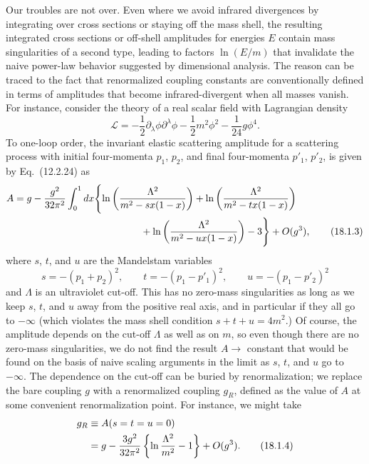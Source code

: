 Our troubles are not over. Even where we avoid infrared divergences by
integrating over cross sections or staying off the mass shell, the resulting
integrated cross sections or off-shell amplitudes for energies $E$ contain
mass singularities of a second type, leading to factors $\ln(E/m)$ that
invalidate the naive power-law behavior suggested by dimensional analysis.
The reason can be traced to the fact that renormalized coupling constants are
conventionally defined in terms of amplitudes that become infrared-divergent
when all masses vanish. For instance, consider the theory of a real scalar
field with Lagrangian density
\begin{equation}
 \mathcal{L}=-\frac{1}{2}\partial_\lambda\phi\partial^\lambda\phi
 -\frac{1}{2}m^2\phi^2-\frac{1}{24}g\phi^4 .
 \tag{18.1.2}
 \label{eq:18.1.2}
\end{equation}
To one-loop order, the invariant elastic scattering amplitude for a
scattering process with initial four-momenta $p_1$, $p_2$, and final
four-momenta $p'_1$, $p'_2$, is given by Eq.~(12.2.24) as
\begin{align}
 A={}&g-\frac{g^2}{32\pi^2}\int_0^1dx\Biggl\{
 \ln\left(\frac{\Lambda^2}{m^2-sx(1-x)}\right)
 +\ln\left(\frac{\Lambda^2}{m^2-tx(1-x)}\right) \notag\\
 &\hspace{41mm}
 +\ln\left(\frac{\Lambda^2}{m^2-ux(1-x)}\right)-3\Biggr\}
 +O(g^3) ,
 \tag{18.1.3}
 \label{eq:18.1.3}
\end{align}
where $s$, $t$, and $u$ are the Mandelstam variables
\[
 s=-(p_1+p_2)^2,\qquad t=-(p_1-p'_1)^2,\qquad
 u=-(p_1-p'_2)^2
\]
and $\Lambda$ is an ultraviolet cut-off. This has no zero-mass singularities
as long as we keep $s$, $t$, and $u$ away from the positive real axis, and in
particular if they all go to $-\infty$ (which violates the mass shell
condition $s+t+u=4m^2$.) Of course, the amplitude depends on the cut-off
$\Lambda$ as well as on $m$, so even though there are no zero-mass
singularities, we do not find the result $A\to$ constant that would be found
on the basis of naive scaling arguments in the limit as $s$, $t$, and $u$ go
to $-\infty$. The dependence on the cut-off can be buried by renormalization;
we replace the bare coupling $g$ with a renormalized coupling $g_R$, defined
as the value of $A$ at some convenient renormalization point. For instance,
we might take
\begin{align}
 g_R&\equiv A(s=t=u=0) \notag\\
 &=g-\frac{3g^2}{32\pi^2}\left\{\ln\frac{\Lambda^2}{m^2}-1\right\}
 +O(g^3) .
 \tag{18.1.4}
 \label{eq:18.1.4}
\end{align}
